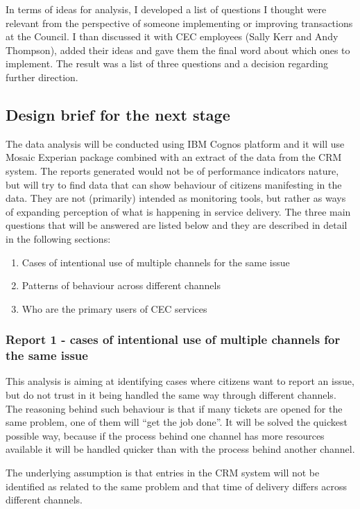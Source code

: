 In terms of ideas for analysis, I developed a list of questions I thought were relevant from the perspective of someone implementing or improving transactions at the Council. I than discussed it with CEC employees (Sally Kerr and Andy Thompson), added their ideas and gave them the final word about which ones to implement. The result was a list of three questions and a decision regarding further direction.
		
		\subsection{Design brief for the next stage}
		
The data analysis will be conducted using IBM Cognos platform and it will use Mosaic Experian package combined with an extract of the data from the CRM system. The reports generated would not be of performance indicators nature, but will try to find data that can show behaviour of citizens manifesting in the data. They are not (primarily) intended as monitoring tools, but rather as ways of expanding perception of what is happening in service delivery. The three main questions that will be answered are listed below and they are described in detail in the following sections:
\begin{enumerate}
\item Cases of intentional use of multiple channels for the same issue
\item Patterns of behaviour across different channels
\item Who are the primary users of CEC services
\end{enumerate}
		
			\subsubsection{Report 1 - cases of intentional use of multiple channels for the same issue}
			
This analysis is aiming at identifying cases where citizens want to report an issue, but do not trust in it being handled the same way through different channels. The reasoning behind such behaviour is that if many tickets are opened for the same problem, one of them will “get the job done”. It will be solved the quickest possible way, because if the process behind one channel has more resources available it will be handled quicker than with the process behind another channel.

The underlying assumption is that entries in the CRM system will not be identified as related to the same problem and that time of delivery differs across different channels.

